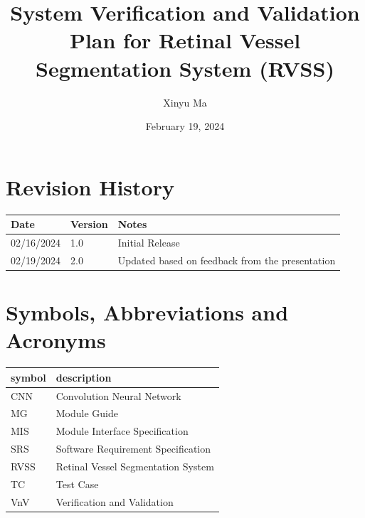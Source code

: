 \documentclass[12pt, titlepage]{article}
\begin{document}
\title{System Verification and Validation Plan for Retinal Vessel Segmentation System (RVSS)}
\author{Xinyu Ma}
\date{February 19, 2024}
	
\maketitle


\section{Revision History}

\begin{tabularx}{\textwidth}{p{5cm}p{1.5cm}X}
\toprule {\bf Date} & {\bf Version} & {\bf Notes}\\
\midrule
02/16/2024 & 1.0 & Initial Release  \\
02/19/2024 & 2.0 & Updated based on feedback from the presentation\\ 


\bottomrule
\end{tabularx}

\newpage

\tableofcontents

\listoftables


\newpage

\section{Symbols, Abbreviations and Acronyms}

\renewcommand{\arraystretch}{1.2}
\begin{tabular}{l l} 
  \toprule		
  \textbf{symbol} & \textbf{description}\\
  \midrule 
  CNN & Convolution Neural Network\\
  MG & Module Guide \\
  MIS & Module Interface Specification \\
  SRS & Software Requirement Specification\\
  RVSS & Retinal Vessel Segmentation System \\ 
  TC & Test Case \\
  VnV & Verification and Validation \\ 
  
  \bottomrule
\end{tabular}\\
\end{document}
